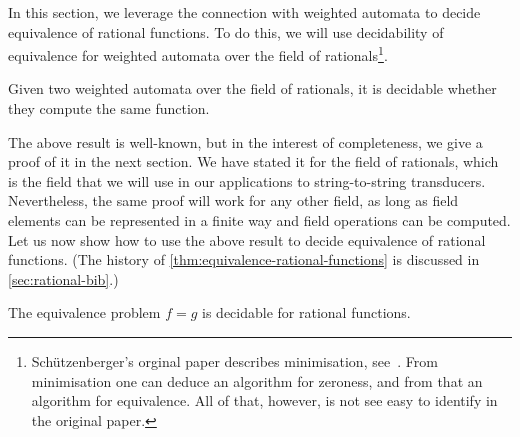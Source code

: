 In this section, we leverage the connection with weighted automata to decide equivalence of rational functions. To do this, we will use decidability of equivalence for weighted automata over the  field of rationals\footnote{Sch\"utzenberger's orginal paper describes minimisation, see~\cite[Section B]{Schutzenberger1961OnTheDefinition}. From minimisation one can deduce an algorithm for zeroness, and from that an algorithm for equivalence. All of that, however, is not see easy to identify in the original paper.}.
\begin{theorem}\label{thm:equivalence-weighted-automata}
    Given two weighted automata over the field of rationals, it is decidable whether they compute the same function.    
\end{theorem}
The above result is well-known, but in the interest of completeness, we give a proof of it in the next section.  We have stated it for the field of rationals, which is the field that we will use in our applications to string-to-string transducers. Nevertheless, the same proof will work  for any other field, as long as field elements can be represented in a finite way and field operations can be computed. Let us now show how to use the above result to decide equivalence of rational functions. (The history of \cref{thm:equivalence-rational-functions} is discussed in \cref{sec:rational-bib}.)
\begin{theorem}\label{thm:equivalence-rational-functions}
    The equivalence problem $f=g$ is decidable for rational functions.
\end{theorem}

